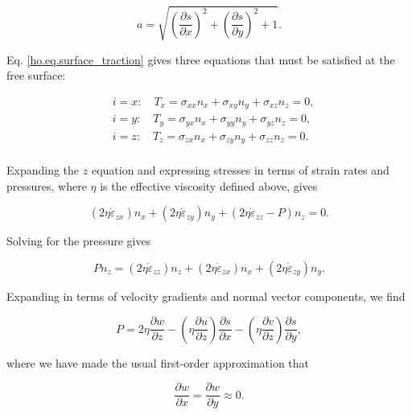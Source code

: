 \begin{equation}
  a = \sqrt{\left( \frac{\partial s}{\partial x} \right)^{2} + \left( \frac{\partial s}{\partial y} \right)^{2} + 1}.
\end{equation}

\noindent
Eq. \eqref{ho.eq.surface_traction} gives three equations that must be satisfied at the free surface:

\begin{equation}
  \begin{split}
    & i=x: \quad T_{x} = \sigma _{xx}n_{x} + \sigma _{xy}n_{y} + \sigma _{xz}n_{z}=0, \\ 
    & i=y: \quad T_{y} = \sigma _{yx}n_{x} + \sigma _{yy}n_{y} + \sigma _{yz}n_{z}=0, \\ 
    & i=z: \quad T_{z} = \sigma _{zx}n_{x} + \sigma _{zy}n_{y} + \sigma _{zz}n_{z}=0. \\ 
  \end{split}
\end{equation}

\noindent
Expanding the $z$ equation and expressing stresses in terms of strain rates and pressures, where $\eta$ is the effective viscosity defined above, gives

\begin{equation}
  \left( 2\eta \dot{\varepsilon }_{zx} \right)n_{x}+\left( 2\eta \dot{\varepsilon }_{zy} \right)n_{y}+\left( 2\eta \dot{\varepsilon }_{zz}-P \right)n_{z}=0.
\end{equation}

\noindent
Solving for the pressure gives

\begin{equation}
  Pn_{z} = \left( 2\eta \dot{\varepsilon }_{zz} \right)n_{z}+\left( 2\eta \dot{\varepsilon }_{zx} \right)n_{x}+\left( 2\eta \dot{\varepsilon }_{zy} \right)n_{y}.
\end{equation}

\noindent
Expanding in terms of velocity gradients and normal vector components, we find

\begin{equation}
  P = 2\eta \frac{\partial w}{\partial z}-\left( \eta \frac{\partial u}{\partial z} \right)\frac{\partial s}{\partial x}-\left( \eta \frac{\partial v}{\partial z} \right)\frac{\partial s}{\partial y},
\end{equation}

where we have made the usual first-order approximation that 

\begin{equation}
  \frac{\partial w}{\partial x}=\frac{\partial w}{\partial y}\approx 0.
\end{equation}

